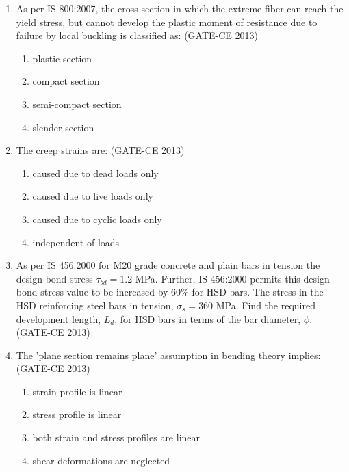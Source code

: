 \documentclass[journal,12pt,onecolumn]{article}
\theoremstyle{remark}
\begin{document}
\begin{enumerate}
    \item As per IS 800:2007, the cross-section in which the extreme fiber can reach the yield stress, but cannot develop the plastic moment of resistance due to failure by local buckling is classified as: (GATE-CE 2013)
    \begin{multicols}{2}
    \begin{enumerate}
        \item plastic section 
        \item compact section 
        \item semi-compact section 
        \item slender section
    \end{enumerate}
    \end{multicols}
    
    \item The creep strains are: (GATE-CE 2013)
    \begin{enumerate}
        \item caused due to dead loads only 
        \item caused due to live loads only 
        \item caused due to cyclic loads only 
        \item independent of loads
    \end{enumerate}
    
    \item As per IS 456:2000 for M20 grade concrete and plain bars in tension the design bond stress $\tau_{bd} = 1.2$ MPa. Further, IS 456:2000 permits this design bond stress value to be increased by 60\% for HSD bars. The stress in the HSD reinforcing steel bars in tension, $\sigma_s = 360$ MPa. Find the required development length, $L_d$, for HSD bars in terms of the bar diameter, $\phi$. \underline{\hspace{3cm}} (GATE-CE 2013)
    
    \item The 'plane section remains plane' assumption in bending theory implies: (GATE-CE 2013)
    \begin{enumerate}
        \item strain profile is linear 
        \item stress profile is linear 
        \item both strain and stress profiles are linear 
        \item shear deformations are neglected
    \end{enumerate}
    

\end{enumerate}
\end{document}
